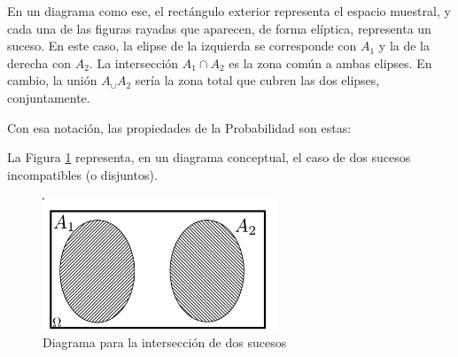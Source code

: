 \begin{itemize}
            En un diagrama como ese, el rectángulo exterior representa el espacio muestral, y cada una de las figuras rayadas que aparecen, de forma elíptica,  representa un suceso. En este caso, la elipse de la izquierda se corresponde con $A_1$ y la de la derecha con $A_2$. La intersección $A_1\cap A_2$ es la zona común a ambas elipses. En cambio, la unión $A_\cup A_2$ sería la zona total que cubren las dos elipses, conjuntamente.

            Con esa notación, las propiedades de la Probabilidad son estas:
            \begin{center}
            \end{center}
    \end{itemize}
La Figura \ref{Cap03:fig:DiagramaVennSucesosDisjuntos} representa, en un diagrama conceptual, el caso de dos sucesos incompatibles (o disjuntos).

\begin{figure}[htbp]
\begin{center}
\includegraphics[height=4cm]{../fig/Cap03-DiagramaVennSucesosDisjuntos.png}
	\caption{Diagrama para la intersección de dos sucesos }\label{Cap03:fig:DiagramaVennSucesosDisjuntos}
\end{center}
\end{figure}

